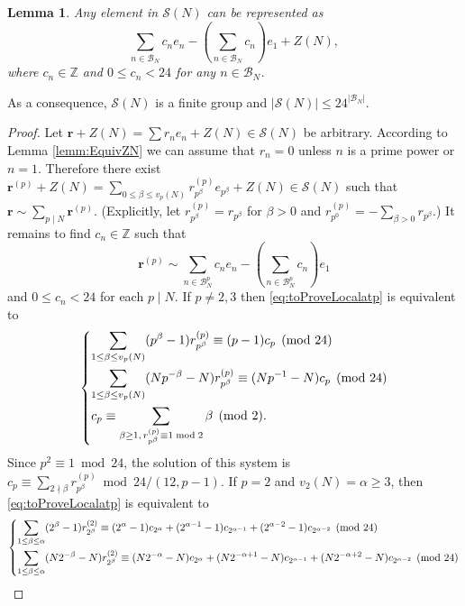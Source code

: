 \documentclass[12pt]{amsart}
\numberwithin{equation}{section}
\theoremstyle{plain}
\newtheorem{lemm}[thm]{Lemma}
\theoremstyle{definition}
\theoremstyle{remark}
\newcommand*\abs[1]{\lvert#1\rvert}
\newcommand\numZ{\mathbb{Z}}
\begin{document}
\begin{lemm}
\label{lemm:SNsimpleForm}
Any element in $\mathscr{S}(N)$ can be represented as
\begin{equation}
\label{eq:elementSNrepr}
\sum_{n\in\mathscr{B}_N}c_ne_n-\left(\sum_{n\in\mathscr{B}_N}c_n\right)e_1+Z(N),
\end{equation}
where $c_n\in\numZ$ and $0\leq c_n<24$ for any $n\in\mathscr{B}_N$.
\end{lemm}
As a consequence, $\mathscr{S}(N)$ is a finite group and $\abs{\mathscr{S}(N)}\leq 24^{\abs{\mathscr{B}_N}}$.
\begin{proof}
Let $\mathbf{r}+Z(N)=\sum r_ne_n+Z(N)\in\mathscr{S}(N)$ be arbitrary. According to Lemma \ref{lemm:EquivZN} we can assume that $r_n=0$ unless $n$ is a prime power or $n=1$. Therefore there exist $\mathbf{r}^{(p)}+Z(N)=\sum_{0\leq\beta\leq v_p(N)}r^{(p)}_{p^\beta}e_{p^\beta}+Z(N)\in\mathscr{S}(N)$ such that $\mathbf{r}\sim\sum_{p\mid N}\mathbf{r}^{(p)}$. (Explicitly, let $r^{(p)}_{p^\beta}=r_{p^\beta}$ for $\beta>0$ and $r^{(p)}_{p^0}=-\sum_{\beta>0}r_{p^\beta}$.) It remains to find $c_n\in\numZ$ such that
\begin{equation}
\label{eq:toProveLocalatp}
\mathbf{r}^{(p)}\sim\sum_{n\in\mathscr{B}_N^p}c_ne_n-\left(\sum_{n\in\mathscr{B}_N^p}c_n\right)e_1
\end{equation}
and $0\leq c_n < 24$ for each $p\mid N$. If $p\neq2,3$ then \eqref{eq:toProveLocalatp} is equivalent to
\begin{equation*}
\begin{dcases}
\sum_{1\leq\beta\leq v_p(N)}(p^\beta-1)r^{(p)}_{p^\beta}\equiv (p-1)c_p \pmod{24}\\
\sum_{1\leq\beta\leq v_p(N)}(Np^{-\beta}-N)r^{(p)}_{p^\beta}\equiv (Np^{-1}-N)c_p \pmod{24}\\
c_p\equiv \sum_{\beta \geq1,\,r^{(p)}_{p^\beta}\equiv1\bmod2}\beta \pmod 2.
\end{dcases}
\end{equation*}
Since $p^2\equiv 1\bmod{24}$, the solution of this system is $c_p\equiv\sum_{2\nmid \beta}r^{(p)}_{p^\beta}\bmod{24/(12,p-1)}$. If $p=2$ and $v_2(N)=\alpha\geq3$, then \eqref{eq:toProveLocalatp} is equivalent to
\begin{equation*}
\begin{dcases}
\sum_{1\leq\beta\leq \alpha}(2^\beta-1)r^{(2)}_{2^\beta}\equiv (2^\alpha-1)c_{2^\alpha}+(2^{\alpha-1}-1)c_{2^{\alpha-1}}+(2^{\alpha-2}-1)c_{2^{\alpha-2}} \pmod{24}\\
\sum_{1\leq\beta\leq \alpha}(N2^{-\beta}-N)r^{(2)}_{2^\beta}\equiv (N2^{-\alpha}-N)c_{2^\alpha}+(N2^{-\alpha+1}-N)c_{2^{\alpha-1}}+(N2^{-\alpha+2}-N)c_{2^{\alpha-2}} \pmod{24}\\

\end{dcases}
\end{equation*}
\end{proof}
\end{document}
